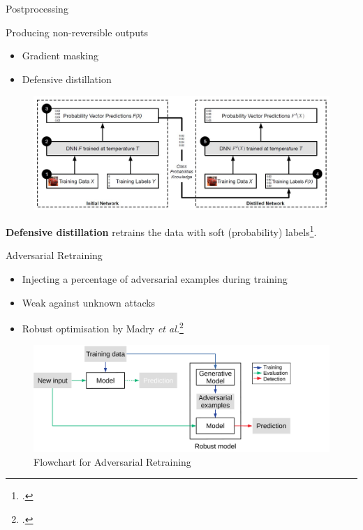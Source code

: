 \documentclass[9pt]{beamer}
\begin{document}
\begin{frame}{Postprocessing}

Producing non-reversible outputs
\begin{itemize}
    \item Gradient masking
    \item Defensive distillation
\end{itemize}

\begin{examples}
    \begin{figure}
        \centering
        \small
        \includegraphics[width=0.8\linewidth]{images/distillation.jpg}
    \end{figure}
    \textbf{Defensive distillation} retrains the data with soft (probability) labels\footcite{papernot2016distillation}.
\end{examples}

\end{frame}

\begin{frame}{Adversarial Retraining}
\label{adv_training}

\begin{itemize}
    \item Injecting a percentage of adversarial examples during training
    \item Weak against unknown attacks
    \item Robust optimisation by Madry {\em et al.}\footcite{madry2017towards}
\end{itemize}

\begin{figure}
    \centering
    \includegraphics[width=0.8\linewidth]{images/adversarial-training.pdf}
    \caption{Flowchart for Adversarial Retraining}
\end{figure}

\hyperlink{adv_examples}{}
\end{frame}
\end{document}
